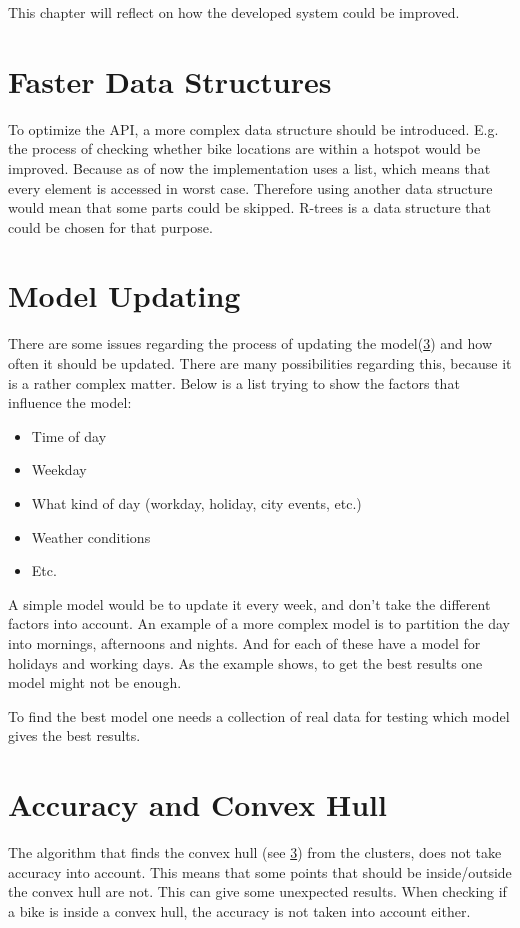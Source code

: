 This chapter will reflect on how the developed system could be improved.

\section{Faster Data Structures}
To optimize the API, a more complex data structure should be introduced.
E.g. the process of checking whether bike locations are within a hotspot would be improved.
Because as of now the implementation uses a list, which means that every element is accessed in worst case.
Therefore using another data structure would mean that some parts could be skipped.
R-trees\cite[Section 25.3.5.3]{database_system_concepts} is a data structure that could be chosen for that purpose.

\section{Model Updating}\label{reflection:model_updating}
There are some issues regarding the process of updating the model(\cref{}) and how often it should be updated.
There are many possibilities regarding this, because it is a rather complex matter.
Below is a list trying to show the factors that influence the model:
\begin{itemize}
\item Time of day
\item Weekday
\item What kind of day (workday, holiday, city events, etc.)
\item Weather conditions
\item Etc.
\end{itemize}
A simple model would be to update it every week, and don't take the different factors into account.
An example of a more complex model is to partition the day into mornings, afternoons and nights.
And for each of these have a model for holidays and working days.
As the example shows, to get the best results one model might not be enough. 

To find the best model one needs a collection of real data for testing which model gives the best results.


\section{Accuracy and Convex Hull}
The algorithm that finds the convex hull (see  \cref{}) from the clusters, does not take accuracy into account.
This means that some points that should be inside/outside the convex hull are not.
This can give some unexpected results.
When checking if a bike is inside a convex hull, the accuracy is not taken into account either.

